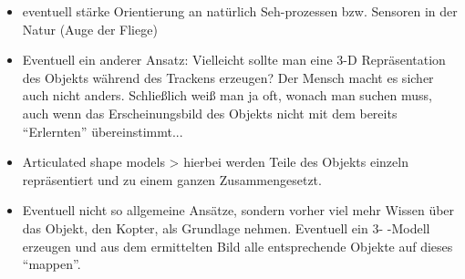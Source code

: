 \begin{itemize}
\item eventuell stärke Orientierung an natürlich Seh-prozessen bzw. Sensoren in der Natur (Auge der Fliege)
\item Eventuell ein anderer Ansatz: Vielleicht sollte man eine 3-D Repräsentation des Objekts während des Trackens erzeugen? Der Mensch macht es sicher auch nicht anders. Schließlich weiß man ja oft, wonach man suchen muss, auch wenn das Erscheinungsbild des Objekts nicht mit dem bereits ``Erlernten'' übereinstimmt...
\item Articulated shape models > hierbei werden Teile des Objekts einzeln repräsentiert und zu einem ganzen Zusammengesetzt. 
\item Eventuell nicht so allgemeine Ansätze, sondern vorher viel mehr Wissen über das Objekt, den Kopter, als Grundlage nehmen. Eventuell ein 3- -Modell erzeugen und aus dem ermittelten Bild alle entsprechende Objekte auf dieses ``mappen''. 
\end{itemize}